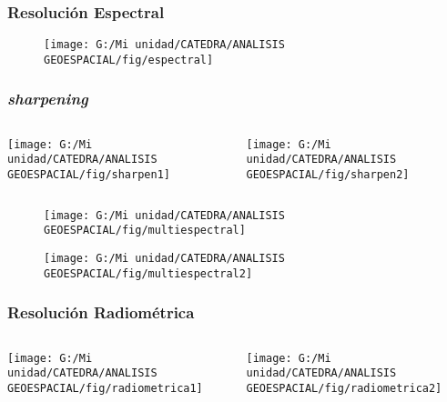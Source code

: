 \documentclass[14pt]{beamer}
\begin{document}
\begin{frame}
\frametitle{Resolución Espectral}
 \begin{figure}
    \centering
    \texttt{[image: G:/Mi unidad/CATEDRA/ANALISIS GEOESPACIAL/fig/espectral]}
  \end{figure}
\end{frame}
\begin{frame}
\frametitle{\emph{sharpening}}
  \begin{columns}
		\begin{column}{.7\linewidth}
		 \texttt{[image: G:/Mi unidad/CATEDRA/ANALISIS GEOESPACIAL/fig/sharpen1]}
		\end{column}
		\begin{column}{.3\linewidth}
\texttt{[image: G:/Mi unidad/CATEDRA/ANALISIS GEOESPACIAL/fig/sharpen2]}
		\end{column}
	\end{columns}
\end{frame}
\begin{frame}
 \begin{figure}
    \centering
    \texttt{[image: G:/Mi unidad/CATEDRA/ANALISIS GEOESPACIAL/fig/multiespectral]}
  \end{figure}
\end{frame}
\begin{frame}
 \begin{figure}
    \centering
    \texttt{[image: G:/Mi unidad/CATEDRA/ANALISIS GEOESPACIAL/fig/multiespectral2]}
  \end{figure}
\end{frame}
\begin{frame}
\frametitle{Resolución Radiométrica}
  \begin{columns}
		\begin{column}{.7\linewidth}
		 \texttt{[image: G:/Mi unidad/CATEDRA/ANALISIS GEOESPACIAL/fig/radiometrica1]}
		\end{column}
		\begin{column}{.3\linewidth}
\texttt{[image: G:/Mi unidad/CATEDRA/ANALISIS GEOESPACIAL/fig/radiometrica2]}
		\end{column}
	\end{columns}
\end{frame}
\end{document}
